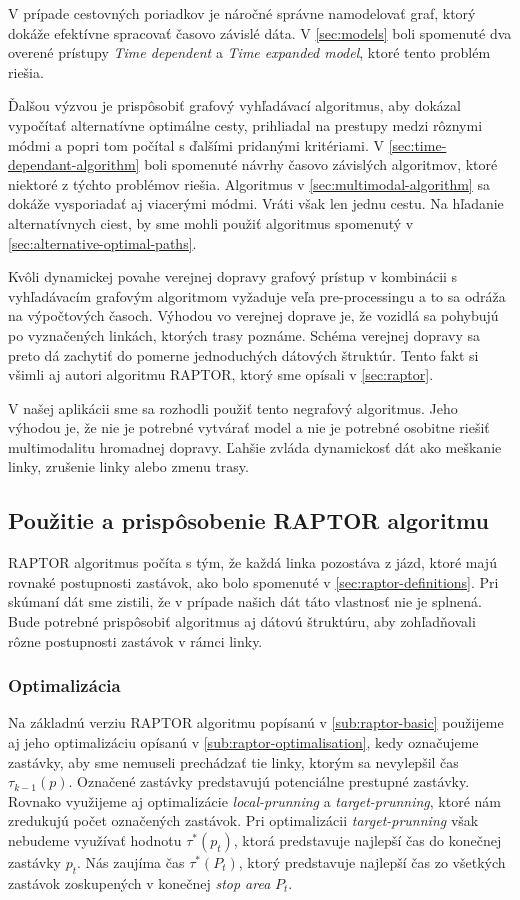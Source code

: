 V prípade cestovných poriadkov je náročné správne namodelovať graf, ktorý dokáže efektívne spracovať časovo závislé dáta. V \ref{sec:models} boli spomenuté dva overené prístupy \textit{Time dependent} a \textit{Time expanded model}, ktoré tento problém riešia. 

Ďalšou výzvou je prispôsobiť grafový vyhľadávací algoritmus, aby dokázal vypočítať alternatívne optimálne cesty, prihliadal na prestupy medzi rôznymi módmi a popri tom počítal s ďalšími pridanými kritériami.
V \ref{sec:time-dependant-algorithm} boli spomenuté návrhy časovo závislých algoritmov, ktoré niektoré z týchto problémov riešia. Algoritmus v \ref{sec:multimodal-algorithm} sa dokáže vysporiadať aj viacerými módmi. Vráti však len jednu cestu. Na hľadanie alternatívnych ciest, by sme mohli použiť algoritmus spomenutý v \ref{sec:alternative-optimal-paths}.

Kvôli dynamickej povahe verejnej dopravy grafový prístup v kombinácii s vyhľadávacím grafovým algoritmom vyžaduje veľa pre-processingu a to sa odráža na výpočtových časoch. Výhodou vo verejnej doprave je, že vozidlá sa pohybujú po vyznačených linkách, ktorých trasy poznáme. Schéma verejnej dopravy sa preto dá zachytiť do pomerne jednoduchých dátových štruktúr. Tento fakt si všimli aj autori algoritmu RAPTOR, ktorý sme opísali v \ref{sec:raptor}. 

V našej aplikácii sme sa rozhodli použiť tento negrafový algoritmus. Jeho výhodou je, že nie je potrebné vytvárať model a nie je potrebné osobitne riešiť multimodalitu hromadnej dopravy. Ľahšie zvláda dynamickosť dát ako meškanie linky, zrušenie linky alebo zmenu trasy. 

\subsection{Použitie a prispôsobenie RAPTOR algoritmu}
RAPTOR algoritmus počíta s tým, že každá linka pozostáva z jázd, ktoré majú rovnaké postupnosti zastávok, ako bolo spomenuté v \ref{sec:raptor-definitions}. Pri skúmaní dát sme zistili, že v prípade našich dát táto vlastnosť nie je splnená. Bude potrebné prispôsobiť algoritmus aj dátovú štruktúru, aby zohľadňovali rôzne postupnosti zastávok v rámci linky.

\subsubsection{Optimalizácia}
Na základnú verziu RAPTOR algoritmu popísanú v \ref{sub:raptor-basic} použijeme aj jeho optimalizáciu opísanú v \ref{sub:raptor-optimalisation}, kedy označujeme zastávky, aby sme nemuseli prechádzať tie linky, ktorým sa nevylepšil čas $\tau_{k-1}(p)$. Označené zastávky predstavujú potenciálne prestupné zastávky.  Rovnako využijeme aj optimalizácie \textit{local-prunning} a \textit{target-prunning}, ktoré nám zredukujú počet označených zastávok. Pri optimalizácii \textit{target-prunning} však nebudeme využívať hodnotu $\tau^*(p_t)$, ktorá predstavuje najlepší čas do konečnej zastávky $p_t$. Nás zaujíma čas $\tau^*(P_t)$, ktorý predstavuje najlepší čas zo všetkých zastávok zoskupených v konečnej \textit{stop area} $P_t$. 

